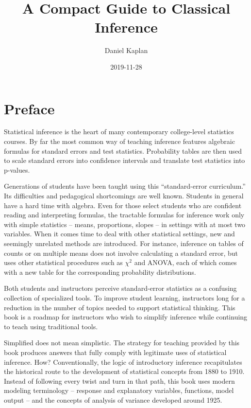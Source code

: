 \documentclass[]{tufte-book}
\title{A Compact Guide to Classical Inference}
\author{Daniel Kaplan}
\date{2019-11-28}
\begin{document}
\maketitle



{
\setcounter{tocdepth}{0}
\tableofcontents
}

\Large

\hypertarget{preface}{%
\chapter*{Preface}\label{preface}}

Statistical inference is the heart of many contemporary college-level statistics courses. By far the most common way of teaching inference features algebraic formulas for standard errors and test statistics. Probability tables are then used to scale standard errors into confidence intervals and translate test statistics into p-values.

Generations of students have been taught using this ``standard-error curriculum.'' Its difficulties and pedagogical shortcomings are well known. Students in general have a hard time with algebra. Even for those select students who are confident reading and interpreting formulas, the tractable formulas for inference work only with simple statistics -- means, proportions, slopes -- in settings with at most two variables. When it comes time to deal with other statistical settings, new and seemingly unrelated methods are introduced. For instance, inference on tables of counts or on multiple means does not involve calculating a standard error, but uses other statistical procedures such as \(\chi^2\) and ANOVA, each of which comes with a new table for the corresponding probability distributions.

Both students and instructors perceive standard-error statistics as a confusing collection of specialized tools. To improve student learning, instructors long for a reduction in the number of topics needed to support statistical thinking. This book is a roadmap for instructors who wish to simplify inference while continuing to teach using traditional tools.

Simplified does not mean simplistic. The strategy for teaching provided by this book produces answers that fully comply with legitimate uses of statistical inference. How? Conventionally, the logic of introductory inference recapitulates the historical route to the development of statistical concepts from 1880 to 1910. Instead of following every twist and turn in that path, this book uses modern modeling terminology -- response and explanatory variables, functions, model output -- and the concepts of analysis of variance developed around 1925.
\end{document}
